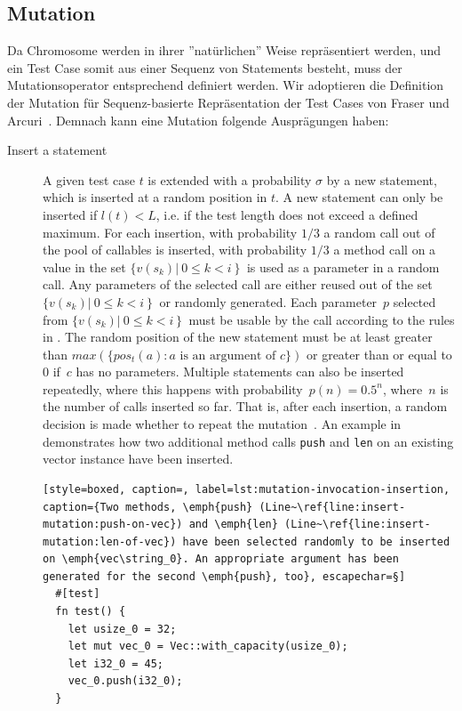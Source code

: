 \documentclass[paper=a4,%
  twoside,%
  BCOR4mm,%
  abstract=true,%
  toc=bibliography,%
  chapterprefix=true,%
  toc=bibliographynumbered,%
  open=right,%
  english,%
  pagesize=pdftex]{scrreprt}
\begin{document}
\subsection{Mutation}
Da Chromosome werden in ihrer ''natürlichen'' Weise repräsentiert werden, und ein Test Case somit aus einer Sequenz von Statements besteht, muss der Mutationsoperator entsprechend definiert werden. Wir adoptieren die Definition der Mutation für Sequenz-basierte Repräsentation der Test Cases von Fraser und Arcuri~\cite{Fraser2012}. Demnach kann eine Mutation folgende Ausprägungen haben:
\begin{description}
  \item[Insert a statement] A given test case $t$ is extended with a probability $\sigma$ by a new statement, which is inserted at a random position in $t$. A new statement can only be inserted if $l(t) < L$, i.e. if the test length does not exceed a defined maximum. For each insertion, with probability $1/3$ a random call out of the pool of callables is inserted, with probability $1/3$ a method call on a value in the set $\{v(s_k) \left|~0 \leq k < i \right\}$ is used as a parameter in a random call. Any parameters of the selected call are either reused out of the set $\{v(s_k) \left|~0 \leq k < i \right\}$ or randomly generated. Each parameter~$p$ selected from $\{v(s_k) \left|~0 \leq k < i \right\}$ must be usable by the call according to the rules in . The random position of the new statement must be at least greater than $max(\{pos_t(a) : a \text{ is an argument of } c\})$ or greater than or equal to $0$ if~$c$ has no parameters. Multiple statements can also be inserted repeatedly, where this happens with probability~$p(n) = 0.5^n$, where~$n$ is the number of calls inserted so far. That is, after each insertion, a random decision is made whether to repeat the mutation~\cite{Tonella2004}. An example in  demonstrates how two additional method calls \texttt{push} and \texttt{len} on an existing vector instance have been inserted. 

  \begin{lstlisting}[style=boxed, caption=, label=lst:mutation-invocation-insertion, caption={Two methods, \emph{push} (Line~\ref{line:insert-mutation:push-on-vec}) and \emph{len} (Line~\ref{line:insert-mutation:len-of-vec}) have been selected randomly to be inserted on \emph{vec\string_0}. An appropriate argument has been generated for the second \emph{push}, too}, escapechar=§]
  #[test]
  fn test() {
    let usize_0 = 32;
    let mut vec_0 = Vec::with_capacity(usize_0);
    let i32_0 = 45;
    vec_0.push(i32_0);
  }


\end{lstlisting}
\end{description}
\end{document}
